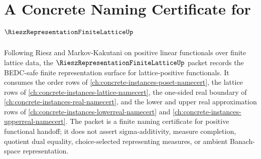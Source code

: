 \chapter{A Concrete Naming Certificate for $\RieszRepresentationFiniteLatticeUp$}
\label{ch:concrete-instances-riesz-representation-finite-lattice-namecert}

Following Riesz and Markov-Kakutani on positive linear functionals over finite lattice data, the $\RieszRepresentationFiniteLatticeUp$ packet records the BEDC-safe finite representation surface for lattice-positive functionals. It consumes the order rows of \autoref{ch:concrete-instances-poset-namecert}, the lattice rows of \autoref{ch:concrete-instances-lattice-namecert}, the one-sided real boundary of \autoref{ch:concrete-instances-real-namecert}, and the lower and upper real approximation rows of \autoref{ch:concrete-instances-lowerreal-namecert} and \autoref{ch:concrete-instances-upperreal-namecert}. The packet is a finite naming certificate for positive functional handoff; it does not assert sigma-additivity, measure completion, quotient dual equality, choice-selected representing measures, or ambient Banach-space representation.


